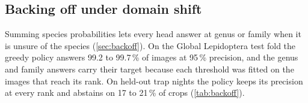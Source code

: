 \subsection{Backing off under domain shift}\label{sec:results_backoff}
Summing species probabilities lets every head answer at genus or family when it is unsure of the species (\cref{sec:backoff}).
On the Global Lepidoptera test fold the greedy policy answers 99.2 to 99.7\,\% of images at 95\,\% precision, and the genus and family answers carry their target because each threshold was fitted on the images that reach its rank.
On held-out trap nights the policy keeps its precision at every rank and abstains on 17 to 21\,\% of crops (\cref{tab:backoff}).

